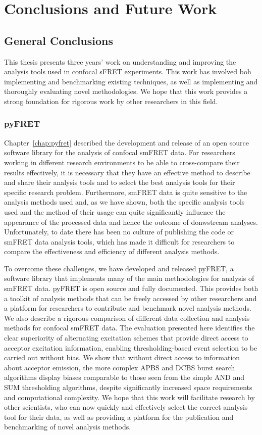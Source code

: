 \chapter{Conclusions and Future Work}
\label{chap:conclusions}

\section{General Conclusions}
This thesis presents three years' work on understanding and improving the analysis tools used in confocal sFRET experiments. This work has involved boh implementing and benchmarking existing techniques, as well as implementing and thoroughly evaluating novel methodologies. We hope that this work provides a strong foundation for rigorous work by other researchers in this field.

\subsection{pyFRET}
Chapter~\ref{chap:pyfret} described the development and release of an open source software library for the analysis of confocal smFRET data. For researchers working in different research environments to be able to cross-compare their results effectively, it is necessary that they have an effective method to describe and share their analysis tools and to select the best analysis tools for their specific research problem. Furthermore, smFRET data is quite sensitive to the analysis methods used and, as we have shown, both the specific analysis tools used and the method of their usage can quite significantly influence the appearance of the processed data and hence the outcome of donwstream analyses. Unfortunately, to date there has been no culture of publishing the code or smFRET data analysis tools, which has made it difficult for researchers to compare the effectiveness and efficiency of different analysis methods.

To overcome these challenges, we have developed and released pyFRET, a software library that implements many of the main methodologies for analysis of smFRET data. pyFRET is open source and fully documented. This provides both a toolkit of analysis methods that can be freely accessed by other researchers and a platform for researchers to contribute and benchmark novel analysis methods. We also describe a rigorous comparison of different data collection and analysis methods for confocal smFRET data. The evaluation presented here identifies the clear superiority of alternating excitation schemes that provide direct access to acceptor excitation information, enabling thresholding-based event selection to be carried out without bias. We show that without direct access to information about acceptor emission, the more complex APBS and DCBS burst search algorithms display biases comparable to those seen from the simple AND and SUM thresholding algorithms, despite significantly increased space requirements and computational complexity. We hope that this work will facilitate research by other scientists, who can now quickly and effectively select the correct analysis tool for their data, as well as providing a platform for the publication and benchmarking of novel analysis methods.

